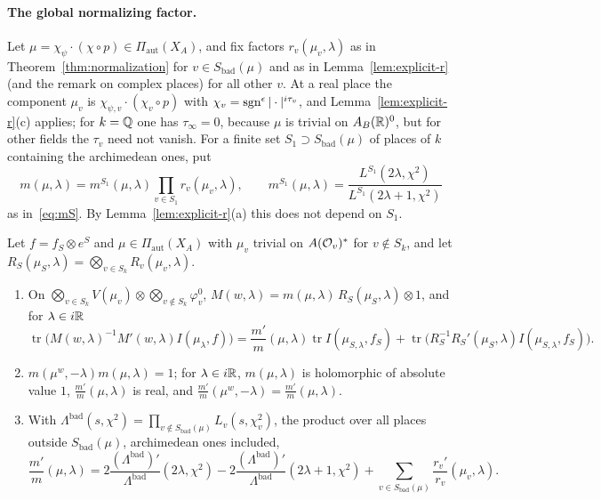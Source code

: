 \paragraph{The global normalizing factor.} Let
$\mu=\chi_\psi\cdot(\chi\circ p)\in\Pi_{\mathrm{aut}}(X_A)$, and fix
factors $r_v(\mu_v,\lambda)$ as in Theorem~\ref{thm:normalization} for
$v\in S_{\mathrm{bad}}(\mu)$ and as in Lemma~\ref{lem:explicit-r} (and
the remark on complex places) for all other $v$. At a real place the
component $\mu_v$ is $\chi_{\psi,v}\cdot(\chi_v\circ p)$ with
$\chi_v=\operatorname{sgn}^\epsilon|\cdot|^{i\tau_v}$, and
Lemma~\ref{lem:explicit-r}(c) applies; for $k=\mathbb{Q}$ one has $\tau_\infty=0$,
because $\mu$ is trivial on $A_B(\mathbb{R})^0$, but for other fields the
$\tau_v$ need not vanish. For a finite set
$S_1\supset S_{\mathrm{bad}}(\mu)$ of places of $k$ containing the
archimedean ones, put
\begin{equation}\label{eq:global-m}
m(\mu,\lambda)=m^{S_1}(\mu,\lambda)\prod_{v\in S_1}r_v(\mu_v,\lambda),
\qquad m^{S_1}(\mu,\lambda)=\frac{L^{S_1}(2\lambda,\chi^2)}
{L^{S_1}(2\lambda+1,\chi^2)}
\end{equation}
as in~\eqref{eq:mS}. By Lemma~\ref{lem:explicit-r}(a) this does not
depend on $S_1$.

\begin{corollary}\label{cor:global-m}
Let $f=f_S\otimes e^S$ and $\mu\in\Pi_{\mathrm{aut}}(X_A)$ with $\mu_v$
trivial on $A(\mathcal{O}_v)^*$ for $v\notin S_k$, and let $R_S(\mu_S,\lambda)=
\bigotimes_{v\in S_k}R_v(\mu_v,\lambda)$.
\begin{enumerate}[label=(\alph*)]
\item On $\bigotimes_{v\in S_k}V(\mu_v)\otimes\bigotimes_{v\notin S_k}
  \varphi_v^0$, $M(w,\lambda)=m(\mu,\lambda)\,R_S(\mu_S,\lambda)\otimes1$,
  and for $\lambda\in i\mathbb{R}$
  \[
  \operatorname{tr}\bigl(M(w,\lambda)^{-1}M'(w,\lambda)I(\mu_\lambda,f)\bigr)
  =\frac{m'}{m}(\mu,\lambda)\operatorname{tr}I(\mu_{S,\lambda},f_S)+
  \operatorname{tr}\bigl(R_S^{-1}R_S'(\mu_S,\lambda)I(\mu_{S,\lambda},f_S)
  \bigr).
  \]
\item $m(\mu^w,-\lambda)m(\mu,\lambda)=1$; for $\lambda\in i\mathbb{R}$,
  $m(\mu,\lambda)$ is holomorphic of absolute value $1$, $\frac{m'}m(\mu,
  \lambda)$ is real, and $\frac{m'}m(\mu^w,-\lambda)=\frac{m'}m(\mu,\lambda)$.
\item With $\Lambda^{\mathrm{bad}}(s,\chi^2)=\prod_{v\notin
  S_{\mathrm{bad}}(\mu)}L_v(s,\chi_v^2)$, the product over all places
  outside $S_{\mathrm{bad}}(\mu)$, archimedean ones included,
  \[
  \frac{m'}m(\mu,\lambda)=2\frac{(\Lambda^{\mathrm{bad}})'}
  {\Lambda^{\mathrm{bad}}}(2\lambda,\chi^2)-2\frac{(\Lambda^{\mathrm{bad}})'}
  {\Lambda^{\mathrm{bad}}}(2\lambda+1,\chi^2)+\sum_{v\in S_{\mathrm{bad}}
  (\mu)}\frac{r_v'}{r_v}(\mu_v,\lambda).
  \]
\end{enumerate}
\end{corollary}

